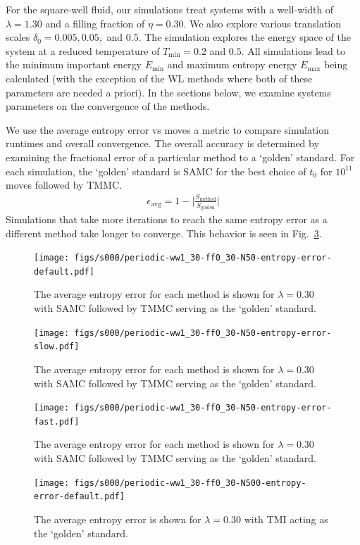 \documentclass[letterpaper,twocolumn,amsmath,amssymb,pre,aps,10pt]{revtex4-1}
\begin{document}
For the square-well fluid, our simulations treat systems with a
well-width of $\lambda = 1.30$ and a filling fraction of
$\eta = 0.30$. We also explore various translation scales $\delta_0 = 0.005,
0.05,$ and $0.5$. The simulation explores the
energy space of the system at a reduced temperature of
$T_{\text{min}} = 0.2$ and $0.5$.  All simulations lead to the minimum important
energy $E_{\min}$ and maximum entropy energy $E_{\max}$
being calculated (with the exception of the WL methods where both
of these parameters are needed a priori).  In the sections below, we
examine systems parameters on the convergence of the methods.

We use the average entropy error vs moves a metric to compare
simulation runtimes and overall convergence. The overall accuracy
is determined by examining the fractional error of a particular method to
a `golden' standard. For each simulation, the `golden' standard is
SAMC for the best choice of $t_0$ for $10^{11}$ moves followed by TMMC.
\begin{align}
\epsilon_\text{avg} = 1 - \bigg\lvert\frac{S_\text{method}}{S_\text{golden}}\bigg\rvert
\end{align}
Simulations that take more iterations to reach the same entropy error as a
different method take longer to converge. This behavior is seen in
Fig.~\ref{fig:N50-ff0.3-avg-error}.

\begin{figure}
  \texttt{[image: figs/s000/periodic-ww1\_30-ff0\_30-N50-entropy-error-default.pdf]}
  \caption{The average entropy error for each method is shown for $\lambda = 0.30$ with
  SAMC followed by TMMC serving as the `golden'
  standard.}\label{fig:N50-ff0.3-avg-error}
\end{figure}
\begin{figure}
  \texttt{[image: figs/s000/periodic-ww1\_30-ff0\_30-N50-entropy-error-slow.pdf]}
  \caption{The average entropy error for each method is shown for $\lambda = 0.30$ with
  SAMC followed by TMMC serving as the `golden'
  standard.}\label{fig:N50-ff0.3-avg-error}
\end{figure}
\begin{figure}
  \texttt{[image: figs/s000/periodic-ww1\_30-ff0\_30-N50-entropy-error-fast.pdf]}
  \caption{The average entropy error for each method is shown for $\lambda = 0.30$ with
  SAMC followed by TMMC serving as the `golden'
  standard.}\label{fig:N50-ff0.3-avg-error}
\end{figure}
\begin{figure}
\texttt{[image: figs/s000/periodic-ww1\_30-ff0\_30-N500-entropy-error-default.pdf]}
  \caption{The average entropy error is shown for $\lambda = 0.30$ with TMI acting as the
  `golden' standard.}\label{fig:n500-ff0.3}
\end{figure}
\end{document}
